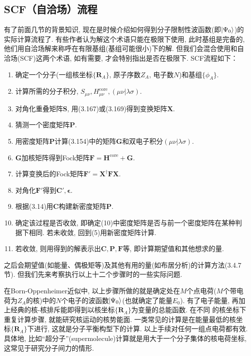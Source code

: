 \subsection{SCF（自洽场）流程}
有了前面几节的背景知识, 
现在是时候介绍如何得到分子限制性波函数(即$\Ket{\Psi_0}$)的实际计算流程了. 
有些作者认为\hft 解这个术语只能在\hft 极限下使用, 
此时基组是完备的, 
他们用自洽场解来称呼在有限基组(基组可能很小)下的解. 
但我们会混合使用\hft 和自洽场(SCF)这两个术语, 
如有需要, 
才会特别指出是否在\hft 极限下. 
SCF流程如下：
\begin{enumerate}[1.]
	\item 确定一个分子(一组核坐标$\{\mathbf{R}_A\}$, 原子序数$Z_A$, 电子数$N$)和基组$\{\phi_A\}$.
	\item 计算所需的分子积分, $S_{\mu\nu},H_{\mu\nu}^\mathrm{core}, (\mu\nu|\lambda\sigma)$.
	\item 对角化重叠矩阵$\mathbf{S}$, 用(3.167)或(3.169)得到变换矩阵$\mathbf{X}$.
	\item 猜测一个密度矩阵$\mathbf{P}$.
	\item 用密度矩阵$\mathbf{P}$计算(3.154)中的矩阵$\mathbf{G}$和双电子积分$(\mu\nu|\lambda\sigma)$.
	\item $\mathbf{G}$加核\ha 矩阵得到Fock矩阵$\mathbf{F=H}^\mathrm{core}+\mathbf{G}$.
	\item 计算变换后的Fock矩阵$\mathbf{F'=X^\dagger FX}$.
	\item 对角化$\mathbf{F'}$得到$\mathbf{C'},\bm{\epsilon}$.
	\item 根据(3.14)用$\mathbf{C}$构建新密度矩阵$\mathbf{P}$.
	\item 确定该过程是否收敛, 即确定(10)中密度矩阵是否与前一个密度矩阵在某种判据下相同. 若未收敛, 回到(5)用新密度矩阵计算.
	\item 若收敛, 则用得到的解表示出$\mathbf{C,P,F}$等, 即计算期望值和其他想求的量.
\end{enumerate}
之后会期望值(如能量、偶极矩等)及其他有用的量(如布居分析)的计算方法(3.4.7节). 
但我们先来考察执行以上十二个步骤时的一些实际问题.


在Born-Oppenheimer近似中, 
以上步骤所做的就是确定处在$M$个点电荷($M$个带电荷为$Z_A$的核)中的$N$个电子的波函数$\Ket{\Psi_0}$(也就确定了能量$E_0$). 
有了电子能量, 
再加上经典的核-核排斥能即得到以核坐标$\{\mathbf{R}_A\}$为变量的总能函数. 
在不同 的核坐标下重复计算步骤, 
就能研究核运动的核势能面. 
一类常见的计算是在能量最低的核坐标$\{\mathbf{R}_A\}$下进行, 
这就是分子平衡构型下的计算. 
以上手续对任何一组点电荷都有效. 
具体地, 
比如``超分子''(supermolecule)计算就是用大于一个分子集体的核电荷坐标, 
这常见于研究分子间力的情形.


